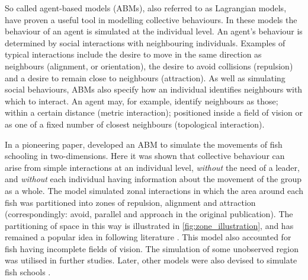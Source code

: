 So called agent-based models (ABMs), also referred to as Lagrangian models,
have proven a useful tool in modelling collective behaviours. In these models
the behaviour of an agent is simulated at the individual level. An agent's
behaviour is determined by social interactions with neighbouring individuals.
Examples of typical interactions include the desire to move in the same
direction as neighbours (alignment, or orientation), the desire to avoid
collisions (repulsion) and a desire to remain close to neighbours (attraction).
As well as simulating social behaviours, ABMs also specify how an individual
identifies neighbours with which to interact. An agent may, for example,
identify neighbours as those; within a certain distance (metric interaction);
positioned inside a field of vision or as one of a fixed number of closest
neighbours (topological interaction).

In a pioneering paper, \textcite{aoki82} developed an ABM to simulate the
movements of fish schooling in two-dimensions. Here it was shown that
collective behaviour can arise from simple interactions at an individual level,
\emph{without} the need of a leader, and \emph{without} each individual having
information about the movement of the group as a whole. The model simulated
zonal interactions in which the area around each fish was partitioned into
zones of repulsion, alignment and attraction (correspondingly: avoid, parallel
and approach in the original publication). The partitioning of space in this
way is illustrated in \cref{fig:zone_illustration}, and has remained a popular
idea in following literature \parencite{huth92, vicsek95, couzin02, couzin05}.
This model also accounted for fish having incomplete fields of vision. The
simulation of some unobserved region was utilised in further studies. Later,
other models were also devised to simulate fish schools \parencite{okubo86,
huth92}.

